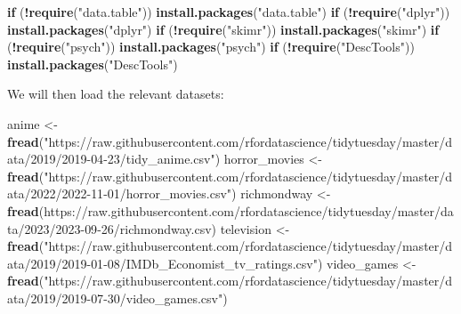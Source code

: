 \documentclass[
]{book}
\newenvironment{Shaded}{\begin{snugshade}}{\end{snugshade}}
\newcommand{\ControlFlowTok}[1]{\textcolor[rgb]{0.13,0.29,0.53}{\textbf{#1}}}
\newcommand{\FunctionTok}[1]{\textcolor[rgb]{0.13,0.29,0.53}{\textbf{#1}}}
\newcommand{\NormalTok}[1]{#1}
\newcommand{\OtherTok}[1]{\textcolor[rgb]{0.56,0.35,0.01}{#1}}
\newcommand{\SpecialCharTok}[1]{\textcolor[rgb]{0.81,0.36,0.00}{\textbf{#1}}}
\newcommand{\StringTok}[1]{\textcolor[rgb]{0.31,0.60,0.02}{#1}}
\begin{document}
\begin{Shaded}
\begin{Highlighting}[]
\ControlFlowTok{if}\NormalTok{ (}\SpecialCharTok{!}\FunctionTok{require}\NormalTok{(}\StringTok{"data.table"}\NormalTok{)) }\FunctionTok{install.packages}\NormalTok{(}\StringTok{"data.table"}\NormalTok{)}
\ControlFlowTok{if}\NormalTok{ (}\SpecialCharTok{!}\FunctionTok{require}\NormalTok{(}\StringTok{"dplyr"}\NormalTok{)) }\FunctionTok{install.packages}\NormalTok{(}\StringTok{"dplyr"}\NormalTok{)}
\ControlFlowTok{if}\NormalTok{ (}\SpecialCharTok{!}\FunctionTok{require}\NormalTok{(}\StringTok{"skimr"}\NormalTok{)) }\FunctionTok{install.packages}\NormalTok{(}\StringTok{"skimr"}\NormalTok{)}
\ControlFlowTok{if}\NormalTok{ (}\SpecialCharTok{!}\FunctionTok{require}\NormalTok{(}\StringTok{"psych"}\NormalTok{)) }\FunctionTok{install.packages}\NormalTok{(}\StringTok{"psych"}\NormalTok{)}
\ControlFlowTok{if}\NormalTok{ (}\SpecialCharTok{!}\FunctionTok{require}\NormalTok{(}\StringTok{"DescTools"}\NormalTok{)) }\FunctionTok{install.packages}\NormalTok{(}\StringTok{"DescTools"}\NormalTok{)}
\end{Highlighting}
\end{Shaded}

We will then load the relevant datasets:

\begin{Shaded}
\begin{Highlighting}[]
\NormalTok{anime }\OtherTok{\textless{}{-}} \FunctionTok{fread}\NormalTok{(}\StringTok{"https://raw.githubusercontent.com/rfordatascience/tidytuesday/master/data/2019/2019{-}04{-}23/tidy\_anime.csv"}\NormalTok{)}
\NormalTok{horror\_movies }\OtherTok{\textless{}{-}} \FunctionTok{fread}\NormalTok{(}\StringTok{"https://raw.githubusercontent.com/rfordatascience/tidytuesday/master/data/2022/2022{-}11{-}01/horror\_movies.csv"}\NormalTok{)}
\NormalTok{richmondway }\OtherTok{\textless{}{-}} \FunctionTok{fread}\NormalTok{(}\StringTok{\textquotesingle{}https://raw.githubusercontent.com/rfordatascience/tidytuesday/master/data/2023/2023{-}09{-}26/richmondway.csv\textquotesingle{}}\NormalTok{)}
\NormalTok{television }\OtherTok{\textless{}{-}} \FunctionTok{fread}\NormalTok{(}\StringTok{"https://raw.githubusercontent.com/rfordatascience/tidytuesday/master/data/2019/2019{-}01{-}08/IMDb\_Economist\_tv\_ratings.csv"}\NormalTok{)}
\NormalTok{video\_games }\OtherTok{\textless{}{-}} \FunctionTok{fread}\NormalTok{(}\StringTok{"https://raw.githubusercontent.com/rfordatascience/tidytuesday/master/data/2019/2019{-}07{-}30/video\_games.csv"}\NormalTok{)}
\end{Highlighting}
\end{Shaded}
\end{document}
